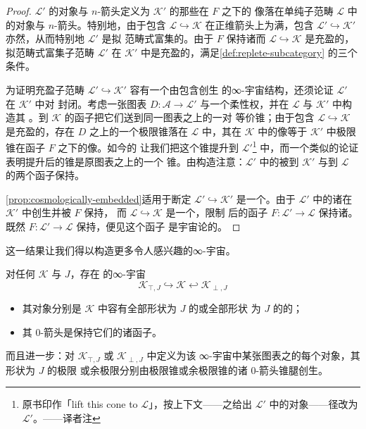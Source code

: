 \begin{proof}
\trPullback{} $\mathcal{L}'$ 的对象与 $n$-箭头定义为 $\mathcal{K}'$ 的那些在 $F$ 之下的
像落在单纯子范畴 $\mathcal{L}$ 中的对象与 $n$-箭头。特别地，由于包含
$\mathcal{L}\hookrightarrow\mathcal{K}$ 在正维箭头上为满，包含
$\mathcal{L}'\hookrightarrow\mathcal{K}'$ 亦然，从而特别地 $\mathcal{L}'$ 是拟
范畴式富集的。由于\trCosmologicalFunctor{} $F$ 保持诸\trEquivalence{}而
$\mathcal{L}\hookrightarrow\mathcal{K}$ 是充盈的，拟范畴式富集子范畴
$\mathcal{L}'$ 在 $\mathcal{K}'$ 中是充盈的，满足\cref{def:replete-subcategory}
的三个条件。

为证明充盈子范畴 $\mathcal{L}'\hookrightarrow\mathcal{K}'$ 容有一个由包含创生
的∞-宇宙结构，还须论证 $\mathcal{L}'$ 在 $\mathcal{K}'$ 中对%
\trFlexibleWeightedLimit{}封闭。考虑一张图表 $D\colon\mathcal{A}\to\mathcal{L}'$
与一个柔性权，并在 $\mathcal{L}$ 与 $\mathcal{K}'$ 中构造其%
\trFlexibleWeightedLimit{}。到 $\mathcal{K}$ 的函子把它们送到同一图表之上的一对
等价锥；由于包含 $\mathcal{L}\hookrightarrow\mathcal{K}$ 是充盈的，存在 $D$
之上的一个极限锥落在 $\mathcal{L}$ 中，其在 $\mathcal{K}$ 中的像等于
$\mathcal{K}'$ 中极限锥在函子 $F$ 之下的像。如今\trPullback{}的\trUniversalProperty{}%
让我们把这个锥提升到 $\mathcal{L}'$\footnote{原书印作「lift this cone to
$\mathcal{L}$」，按上下文——\trPullback{}之\trUniversalProperty{}给出
$\mathcal{L}'$ 中的对象——径改为 $\mathcal{L}'$。——译者注}
中，而一个类似的论证表明提升后的锥是原图表之上的一个\trFlexibleWeightedLimit{}%
锥。由构造注意：$\mathcal{L}'$ 中的\trFlexibleWeightedLimit{}被到 $\mathcal{K}'$
与到 $\mathcal{L}$ 的两个函子保持。

\cref{prop:cosmologically-embedded}适用于断定
$\mathcal{L}'\hookrightarrow\mathcal{K}'$ 是一个\trCosmologicalEmbedding{}。由于
$\mathcal{L}'$ 中的诸\trIsofibration{}在 $\mathcal{K}'$ 中创生并被 $F$ 保持，
而 $\mathcal{L}\hookrightarrow\mathcal{K}$ 是一个\trCosmologicalEmbedding{}，限制
后的函子 $F\colon\mathcal{L}'\to\mathcal{L}$ 保持诸\trIsofibration{}。既然
$F\colon\mathcal{L}'\to\mathcal{L}$ 保持\trFlexibleWeightedLimit{}，便见这个函子
是宇宙论的。
\end{proof}

这一结果让我们得以构造更多令人感兴趣的∞-宇宙。

\begin{proposition}\label{prop:J-shaped-cosmoi}
对任何\trInfinityCosmos{} $\mathcal{K}$ 与\trSimplicialSet{} $J$，存在%
\trCosmologicalEmbedding{}的∞-宇宙
\[
\mathcal{K}_{\top,J}\hookrightarrow\mathcal{K}\hookleftarrow\mathcal{K}_{\perp,J}
\]
\begin{itemize}
\item 其对象分别是 $\mathcal{K}$ 中容有全部形状为 $J$ 的\trLimit{}或全部形状
为 $J$ 的\trColimit{}的\trInfinityCategory{}；
\item 其 0-箭头是保持它们的诸函子。
\end{itemize}
而且进一步：对 $\mathcal{K}_{\top,J}$ 或 $\mathcal{K}_{\perp,J}$ 中定义为该
∞-宇宙中某张图表之\trFlexibleWeightedLimit{}的每个对象，其形状为 $J$ 的极限
或余极限分别由极限锥或余极限锥的诸 0-箭头锥腿创生。
\end{proposition}


